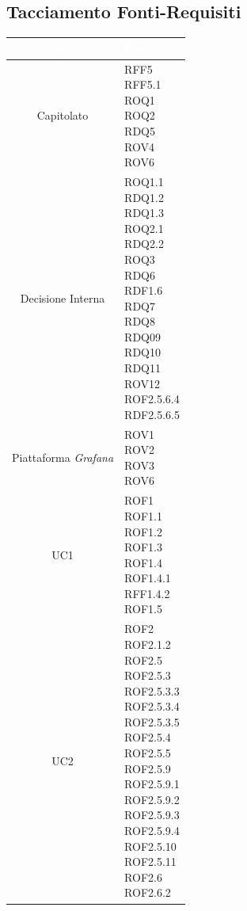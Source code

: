 \subsection{Tacciamento Fonti-Requisiti}\label{Tracciamento}
\begin{center}
\begin{longtable}[c]{|c|m{}|}
\hline
\rowcolor{bluelogo}\textbf{\textcolor{white}{Fonte}} & \textbf{\textcolor{white}{Requisiti}}\\
\hline \hline
\endhead
Capitolato & \makecell{RFF5\\RFF5.1\\ROQ1\\ROQ2\\RDQ5\\ROV4\\ROV6}\\
\hline
\rowcolor{grigio}Decisione Interna & \makecell{ROQ1.1\\RDQ1.2 \\ RDQ1.3\\ROQ2.1\\RDQ2.2\\ROQ3\\RDQ6\\RDF1.6\\RDQ7\\RDQ8 \\ RDQ09 \\ RDQ10 \\ RDQ11\\ROV12\\ROF2.5.6.4\\RDF2.5.6.5}\\
\hline
Piattaforma \textit{Grafana} & \makecell{ROV1\\ROV2\\ROV3\\ROV6}\\
\hline
\rowcolor{grigio}UC1 & \makecell{ROF1\\ROF1.1\\ROF1.2\\ROF1.3\\ROF1.4\\ROF1.4.1\\RFF1.4.2\\ROF1.5}\\
\hline
UC2 & \makecell{ROF2\\ROF2.1.2\\ROF2.5\\ROF2.5.3\\ROF2.5.3.3\\ROF2.5.3.4\\ROF2.5.3.5\\ROF2.5.4\\ROF2.5.5\\ROF2.5.9\\ROF2.5.9.1\\ROF2.5.9.2\\ROF2.5.9.3\\ROF2.5.9.4\\ROF2.5.10\\ ROF2.5.11\\ROF2.6\\ROF2.6.2}\\

\end{longtable}
\end{center}
